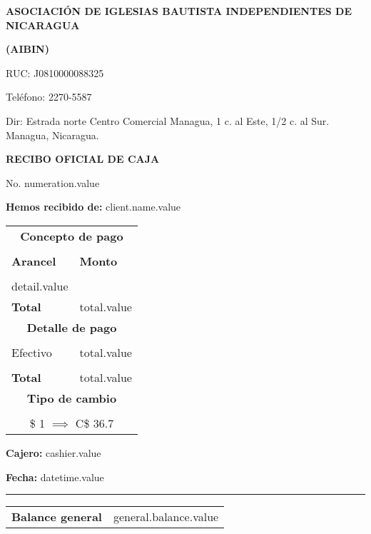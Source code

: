 \documentclass[11pt]{article}
\newcommand{\cashier}{cashier.value}
\newcommand{\datetime}{datetime.value}
\newcommand{\clientName}{client.name.value}
\newcommand{\thenumber}{numeration.value}
\newcommand{\total}{total.value}
\newcommand{\generalBalance}{general.balance.value}
\newcommand{\detail}{detail.value}
\begin{document}
    \begin{center}
        \textbf{ASOCIACIÓN DE IGLESIAS BAUTISTA INDEPENDIENTES DE NICARAGUA}\par
        \textbf{(AIBIN)}\par
        {
            \small
            RUC: J0810000088325\par
            Teléfono: 2270-5587\par
            Dir: Estrada norte Centro Comercial Managua, 1 c. al Este, 1/2 c. al Sur. Managua, Nicaragua.\par
        }
        \textbf{RECIBO OFICIAL DE CAJA}\par
        No. \thenumber
    \end{center}
    \textbf{Hemos recibido de:} \clientName\par

    \begin{longtable}{p{3.8cm} p{1.8cm}}
        \hline
        \multicolumn{2}{c}{\textbf{Concepto de pago}} \\\\
        \textbf{Arancel} & \textbf{Monto} \\\\
        \detail\\
        \textbf{Total} & \total\\
        \hline
        \multicolumn{2}{c}{\textbf{Detalle de pago}} \\\\
        Efectivo & \total\\
        \\\textbf{Total} & \total\\
        \hline
        \multicolumn{2}{c}{\textbf{Tipo de cambio}} \\\\
        \multicolumn{2}{c}{\$ 1 $\implies$ C\$ 36.7}\\
    \end{longtable}
    
    \textbf{Cajero:} \cashier\par
    \textbf{Fecha:} \datetime

    \begin{table}[H]
        \centering
        \hrule
        \begin{tabular}{p{3.5cm} p{2.5cm}}
            \textbf{Balance general} & \generalBalance
        \end{tabular}
    \end{table}
\end{document}
